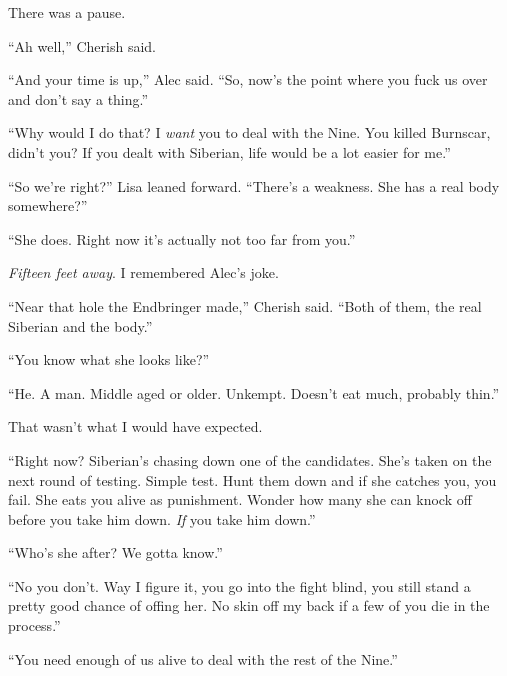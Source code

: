 There was a pause.



``Ah well,'' Cherish said.



``And your time is up,'' Alec said.  ``So, now's the point where you fuck us over and don't say a thing.''



``Why would I do that?  I \emph{want} you to deal with the Nine.  You killed Burnscar, didn't you?  If you dealt with Siberian, life would be a lot easier for me.''



``So we're right?''  Lisa leaned forward.  ``There's a weakness.  She has a real body somewhere?''



``She does.  Right now it's actually not too far from you.''



\emph{Fifteen feet away}.  I remembered Alec's joke.



``Near that hole the Endbringer made,'' Cherish said.  ``Both of them, the real Siberian and the body.''



``You know what she looks like?''



``He.  A man.  Middle aged or older.  Unkempt.  Doesn't eat much, probably thin.''



That wasn't what I would have expected.



``Right now?  Siberian's chasing down one of the candidates.  She's taken on the next round of testing.  Simple test.  Hunt them down and if she catches you, you fail.  She eats you alive as punishment.  Wonder how many she can knock off before you take him down.  \emph{If} you take him down.''



``Who's she after?  We gotta know.''



``No you don't.  Way I figure it, you go into the fight blind, you still stand a pretty good chance of offing her.  No skin off my back if a few of you die in the process.''



``You need enough of us alive to deal with the rest of the Nine.''



